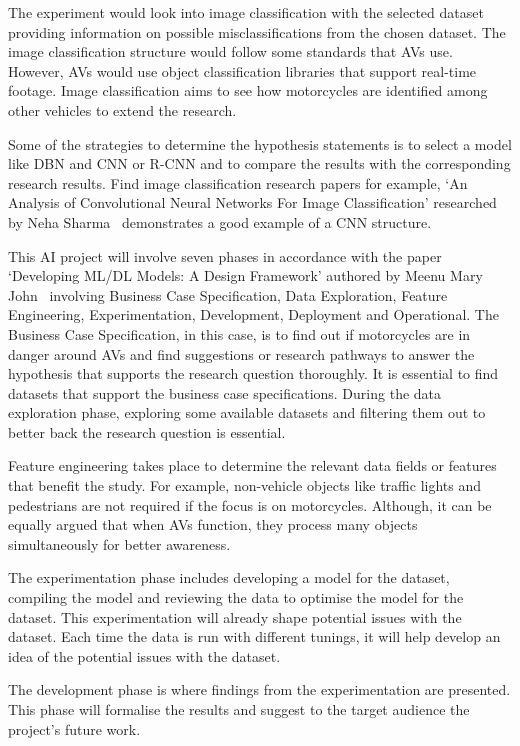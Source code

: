 \documentclass[12pt]{report} %
\begin{document}
        The experiment would look into image classification with the selected dataset providing information on possible misclassifications from the chosen dataset. The image classification structure would follow some standards that AVs use. However, AVs would use object classification libraries that support real-time footage. Image classification aims to see how motorcycles are identified among other vehicles to extend the research.

        Some of the strategies to determine the hypothesis statements is to select a model like DBN and CNN or R-CNN and to compare the results with the corresponding research results. Find image classification research papers for example, `An Analysis of Convolutional Neural Networks For Image Classification' researched by Neha Sharma~\cite{sharma_analysis_2018} demonstrates a good example of a CNN structure. 

        This AI project will involve seven phases in accordance with the paper `Developing ML/DL Models: A Design Framework' authored by Meenu Mary John~\cite{john_developing_2020} involving Business Case Specification, Data Exploration, Feature Engineering, Experimentation, Development, Deployment and Operational. The Business Case Specification, in this case, is to find out if motorcycles are in danger around AVs and find suggestions or research pathways to answer the hypothesis that supports the research question thoroughly. It is essential to find datasets that support the business case specifications. During the data exploration phase, exploring some available datasets and filtering them out to better back the research question is essential. 
        
        Feature engineering takes place to determine the relevant data fields or features that benefit the study. For example, non-vehicle objects like traffic lights and pedestrians are not required if the focus is on motorcycles. Although, it can be equally argued that when AVs function, they process many objects simultaneously for better awareness. 
      
        The experimentation phase includes developing a model for the dataset, compiling the model and reviewing the data to optimise the model for the dataset. This experimentation will already shape potential issues with the dataset. Each time the data is run with different tunings, it will help develop an idea of the potential issues with the dataset. 
      
        The development phase is where findings from the experimentation are presented. This phase will formalise the results and suggest to the target audience the project's future work. 
      
\end{document}
